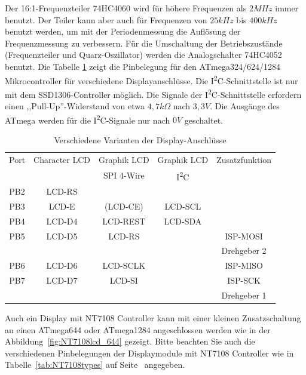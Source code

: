 Der 16:1-Frequenzteiler 74HC4060 wird für höhere Frequenzen als \(2MHz\) immer benutzt.
Der Teiler kann aber auch für Frequenzen von \(25kHz\) bis \(400kHz\) benutzt werden, um mit der
Periodenmessung die Auflösung der Frequenzmessung zu verbessern.
Für die Umschaltung der Betriebszustände (Frequenzteiler und Quarz-Oszillator) werden
die Analogschalter 74HC4052 benutzt.
Die Tabelle \ref{tab:mega644-display} zeigt die Pinbelegung für den ATmega324/624/1284 Mikrocontroller für verschiedene Displayanschlüsse.
Die I\textsuperscript{2}C-Schnittstelle ist nur mit dem SSD1306-Controller möglich.
Die Signale der I\textsuperscript{2}C-Schnittstelle erfordern einen ,,Pull-Up''-Widerstand von etwa \(4,7k\Omega\) nach \(3,3V\).
Die Ausgänge des ATmega werden für die I\textsuperscript{2}C-Signale nur nach \(0V\) geschaltet.


\begin{table}[H]
  \begin{center}
    \begin{tabular}{| c || c | c | c | c |}
    \hline
      Port & Character LCD &  Graphik LCD & Graphik LCD  & Zusatzfunktion      \\
           &               &  SPI 4-Wire  &  I\textsuperscript{2}C         &                     \\
    \hline
    \hline
    PB2    &  LCD-RS         &            &             &       \\
    \hline
    PB3    &  LCD-E          & (LCD-CE)   &  LCD-SCL    &       \\
    \hline
    PB4    &  LCD-D4         & LCD-REST   &  LCD-SDA    &       \\
    \hline
    PB5    &  LCD-D5         & LCD-RS     &             & ISP-MOSI \\
           &                 &            &             & Drehgeber 2 \\
    \hline
    PB6    &  LCD-D6         & LCD-SCLK   &             & ISP-MISO \\
    \hline
    PB7    &  LCD-D7         & LCD-SI     &             & ISP-SCK  \\
           &                 &            &             & Drehgeber 1 \\
    \hline
    \end{tabular}
  \end{center}
  \caption{Verschiedene Varianten der Display-Anschlüsse}
  \label{tab:mega644-display}
\end{table}

Auch ein Display mit NT7108 Controller kann mit einer kleinen Zusatzschaltung an einen
ATmega644 oder ATmega1284 angeschlossen werden wie in der Abbildung~\ref{fig:NT7108lcd_644} gezeigt.
Bitte beachten Sie auch die verschiedenen Pinbelegungen der Displaymodule mit NT7108 Controller wie in
Tabelle~\ref{tab:NT7108types} auf Seite~\pageref{tab:NT7108types} angegeben.

